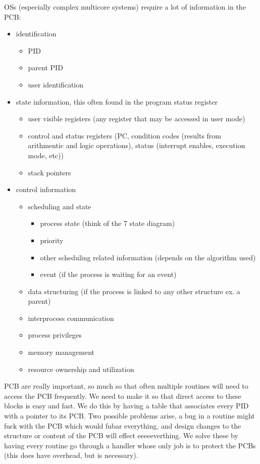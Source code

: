 \documentclass[12pt]{article}
\begin{document}
OSs (especially complex multicore systems) require a lot of information in the PCB:
\begin{itemize}
    \item identification
    \begin{itemize}
        \item PID
        \item parent PID
        \item user identification
    \end{itemize}
    \item state information, this often found in the program status register
    \begin{itemize}
        \item user visible registers (any register that may be accessed in user mode)
        \item control and status registers (PC, condition codes (results from arithmentic and logic operations), status (interrupt enables, execution mode, etc))
        \item stack pointers
    \end{itemize}
    \item control information
    \begin{itemize}
        \item scheduling and state
        \begin{itemize}
            \item process state (think of the 7 state diagram)
            \item priority
            \item other scheduling related information (depends on the algorithm used)
            \item event (if the process is waiting for an event)
        \end{itemize}
        \item data structuring (if the process is linked to any other structure ex. a parent)
        \item interprocess communication
        \item process privileges
        \item memory management
        \item resource ownership and utilization
    \end{itemize}
\end{itemize}

PCB are really important, so much so that often multiple routines will need to access the PCB frequently. We need to make it so that direct access to these blocks is easy and fast. We do this by having a table that associates every PID with a pointer to its PCB. Two possible problems arise, a bug in a routine might fuck with the PCB which would fubar everything, and design changes to the structure or content of the PCB will effect eeeeeverthing. We solve these by having every routine go through a handler whose only job is to protect the PCBs (this does have overhead, but is necessary).
\end{document}
